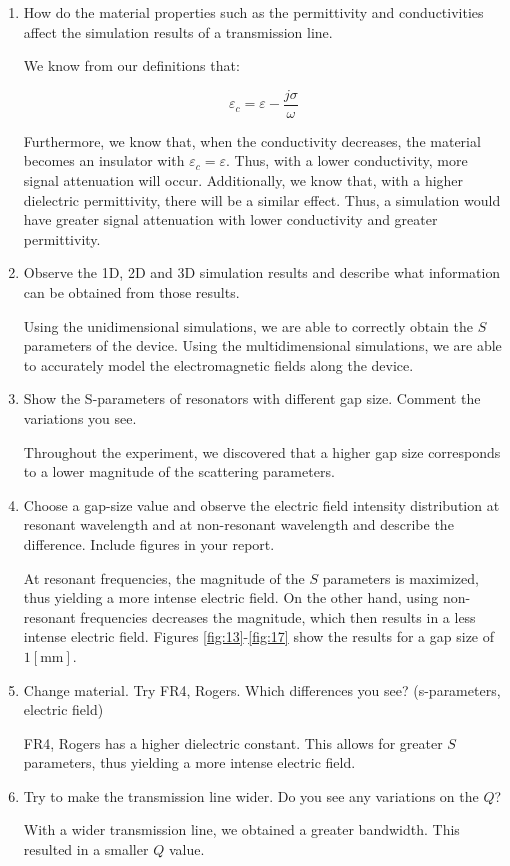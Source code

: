 \documentclass[
	letterpaper, %
	10pt, %
]{CSUniSchoolLabReport}
\begin{document}
\begin{enumerate}
  \item How do the material properties such as the permittivity and conductivities affect the simulation results of a transmission line.

    We know from our definitions that:

    $$\varepsilon_c=\varepsilon-\frac{j\sigma}{\omega}$$

    Furthermore, we know that, when the conductivity decreases, the material becomes an insulator with $\varepsilon_c=\varepsilon$. Thus, with a lower conductivity, more signal attenuation will occur. Additionally, we know that, with a higher dielectric permittivity, there will be a similar effect. Thus, a simulation would have greater signal attenuation with lower conductivity and greater permittivity.

  \item Observe the 1D, 2D and 3D simulation results and describe what information can be obtained from those results.

    Using the unidimensional simulations, we are able to correctly obtain the $S$ parameters of the device. Using the multidimensional simulations, we are able to accurately model the electromagnetic fields along the device.

  \item Show the S-parameters of resonators with different gap size. Comment the variations you see.

    Throughout the experiment, we discovered that a higher gap size corresponds to a lower magnitude of the scattering parameters.

  \item Choose a gap-size value and observe the electric field intensity distribution at resonant wavelength and at non-resonant wavelength and describe the difference. Include figures in your report.

    At resonant frequencies, the magnitude of the $S$ parameters is maximized, thus yielding a more intense electric field. On the other hand, using non-resonant frequencies decreases the magnitude, which then results in a less intense electric field. Figures \ref{fig:13}-\ref{fig:17} show the results for a gap size of $1[\si{\milli\meter}]$.

  \item Change material. Try FR4, Rogers. Which differences you see? (s-parameters, electric field)

    FR4, Rogers has a higher dielectric constant. This allows for greater $S$ parameters, thus yielding a more intense electric field.

  \item Try to make the transmission line wider. Do you see any variations on the $Q$?

    With a wider transmission line, we obtained a greater bandwidth. This resulted in a smaller $Q$ value.

\end{enumerate}
\end{document}
